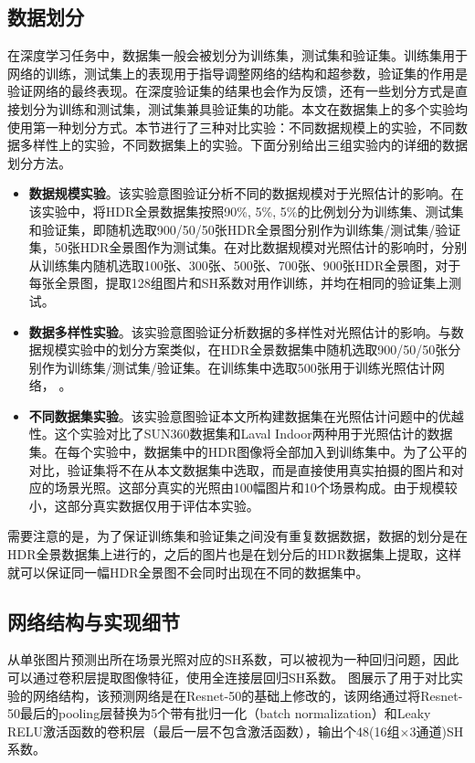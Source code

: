\subsection{数据划分}
在深度学习任务中，数据集一般会被划分为训练集，测试集和验证集。训练集用于网络的训练，测试集上的表现用于指导调整网络的结构和超参数，验证集的作用是验证网络的最终表现。在深度验证集的结果也会作为反馈，还有一些划分方式是直接划分为训练和测试集，测试集兼具验证集的功能。本文在数据集上的多个实验均使用第一种划分方式。本节进行了三种对比实验：不同数据规模上的实验，不同数据多样性上的实验，不同数据集上的实验。下面分别给出三组实验内的详细的数据划分方法。
\begin{itemize}
    \item \textbf{数据规模实验}。该实验意图验证分析不同的数据规模对于光照估计的影响。在该实验中，将HDR全景数据集按照90\%, 5\%, 5\%的比例划分为训练集、测试集和验证集，即随机选取900/50/50张HDR全景图分别作为训练集/测试集/验证集，50张HDR全景图作为测试集。在对比数据规模对光照估计的影响时，分别从训练集内随机选取100张、300张、500张、700张、900张HDR全景图，对于每张全景图，提取128组图片和SH系数对用作训练，并均在相同的验证集上测试。
    \item \textbf{数据多样性实验}。该实验意图验证分析数据的多样性对光照估计的影响。与数据规模实验中的划分方案类似，在HDR全景数据集中随机选取900/50/50张分别作为训练集/测试集/验证集。在训练集中选取500张用于训练光照估计网络， 。
    \item \textbf{不同数据集实验}。该实验意图验证本文所构建数据集在光照估计问题中的优越性。这个实验对比了SUN360\cite{xiao2012recognizing}数据集和Laval Indoor\cite{gardner2017learning}两种用于光照估计的数据集。在每个实验中，数据集中的HDR图像将全部加入到训练集中。为了公平的对比，验证集将不在从本文数据集中选取，而是直接使用真实拍摄的图片和对应的场景光照。这部分真实的光照由100幅图片和10个场景构成。由于规模较小，这部分真实数据仅用于评估本实验。
\end{itemize}

需要注意的是，为了保证训练集和验证集之间没有重复数据数据，数据的划分是在HDR全景数据集上进行的，之后的图片也是在划分后的HDR数据集上提取，这样就可以保证同一幅HDR全景图不会同时出现在不同的数据集中。
\subsection{网络结构与实现细节}
从单张图片预测出所在场景光照对应的SH系数，可以被视为一种回归问题，因此可以通过卷积层提取图像特征，使用全连接层回归SH系数。
图展示了用于对比实验的网络结构，该预测网络是在Resnet-50\cite{he2016deep}的基础上修改的，该网络通过将Resnet-50最后的pooling层替换为5个带有批归一化（batch normalization）\cite{ioffe2015batch}和Leaky RELU激活函数\cite{maas2013rectifier}的卷积层（最后一层不包含激活函数），输出个48(16组$\times$3通道)SH系数。


